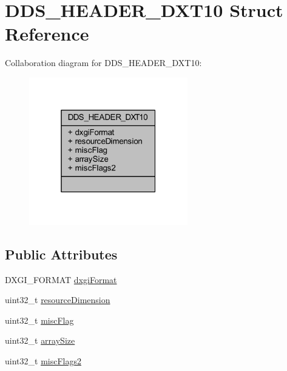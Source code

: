 \hypertarget{struct_d_d_s___h_e_a_d_e_r___d_x_t10}{}\section{D\+D\+S\+\_\+\+H\+E\+A\+D\+E\+R\+\_\+\+D\+X\+T10 Struct Reference}
\label{struct_d_d_s___h_e_a_d_e_r___d_x_t10}


Collaboration diagram for D\+D\+S\+\_\+\+H\+E\+A\+D\+E\+R\+\_\+\+D\+X\+T10\+:\nopagebreak
\begin{figure}[H]
\begin{center}
\leavevmode
\includegraphics[width=196pt]{struct_d_d_s___h_e_a_d_e_r___d_x_t10__coll__graph}
\end{center}
\end{figure}
\subsection*{Public Attributes}
\begin{DoxyCompactItemize}
\item 
D\+X\+G\+I\+\_\+\+F\+O\+R\+M\+AT \hyperlink{struct_d_d_s___h_e_a_d_e_r___d_x_t10_a7208befc03e44222386ee54ee4fa9ec6_a7208befc03e44222386ee54ee4fa9ec6}{dxgi\+Format}
\item 
uint32\+\_\+t \hyperlink{struct_d_d_s___h_e_a_d_e_r___d_x_t10_a9e52c1afbd5b8205619d1b89a367b438_a9e52c1afbd5b8205619d1b89a367b438}{resource\+Dimension}
\item 
uint32\+\_\+t \hyperlink{struct_d_d_s___h_e_a_d_e_r___d_x_t10_ab1ed2a42216afc03971b56f7833c8c05_ab1ed2a42216afc03971b56f7833c8c05}{misc\+Flag}
\item 
uint32\+\_\+t \hyperlink{struct_d_d_s___h_e_a_d_e_r___d_x_t10_ac4da0d495a89e556d02ac256af28da41_ac4da0d495a89e556d02ac256af28da41}{array\+Size}
\item 
uint32\+\_\+t \hyperlink{struct_d_d_s___h_e_a_d_e_r___d_x_t10_acfdbfd584a5c6de801da3c8d2f0e1a40_acfdbfd584a5c6de801da3c8d2f0e1a40}{misc\+Flags2}
\end{DoxyCompactItemize}


